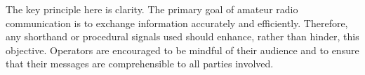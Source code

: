 The key principle here is clarity. The primary goal of amateur radio communication is to exchange information accurately and efficiently. Therefore, any shorthand or procedural signals used should enhance, rather than hinder, this objective. Operators are encouraged to be mindful of their audience and to ensure that their messages are comprehensible to all parties involved.

